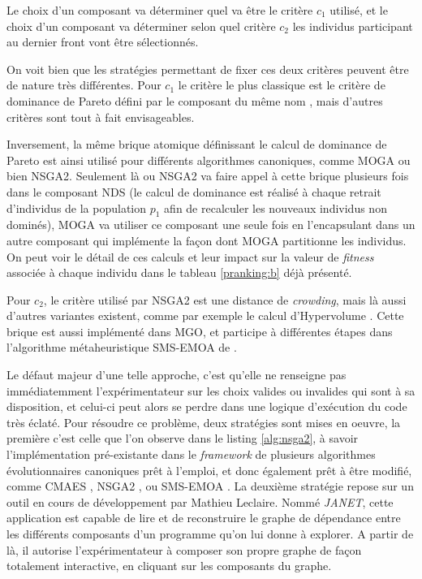Le choix d'un composant  va déterminer quel va être le critère $c_1$ utilisé, et le choix d'un composant  va déterminer selon quel critère $c_2$ les individus participant au dernier front vont être sélectionnés.

On voit bien que les stratégies permettant de fixer ces deux critères peuvent être de nature très différentes. Pour $c_1$ le critère le plus classique est le critère de dominance de Pareto défini par le composant du même nom , mais d'autres critères sont tout à fait envisageables.

Inversement, la même brique atomique  définissant le calcul de dominance de Pareto est ainsi utilisé pour différents algorithmes canoniques, comme MOGA ou bien NSGA2. Seulement là ou NSGA2 va faire appel à cette brique plusieurs fois dans le composant NDS (le calcul de dominance est réalisé à chaque retrait d'individus de la population $p_1$ afin de recalculer les nouveaux individus non dominés), MOGA va utiliser ce composant une seule fois en l'encapsulant dans un autre composant qui implémente la façon dont MOGA partitionne les individus. On peut voir le détail de ces calculs et leur impact sur la valeur de \textit{fitness} associée à chaque individu dans le tableau \ref{pranking:b} déjà présenté.

Pour $c_2$, le critère utilisé par NSGA2 est une distance de \textit{crowding}, mais là aussi d'autres variantes existent, comme par exemple le calcul d'Hypervolume \autocite{Fonseca2006}. Cette brique  est aussi implémenté dans MGO, et participe à différentes étapes dans l'algorithme métaheuristique SMS-EMOA de \textcite{Emmerich2005}.

Le défaut majeur d'une telle approche, c'est qu'elle ne renseigne pas immédiatemment l'expérimentateur sur les choix valides ou invalides qui sont à sa disposition, et celui-ci peut alors se perdre dans une logique d'exécution du code très éclaté. Pour résoudre ce problème, deux stratégies sont mises en oeuvre, la première c'est celle que l'on observe dans le listing \ref{alg:nsga2}, à savoir l'implémentation pré-existante dans le \textit{framework} de plusieurs algorithmes évolutionnaires canoniques prêt à l'emploi, et donc également prêt à être modifié, comme CMAES \autocite{Hansen2001}, NSGA2 \autocite{Deb2001}, ou SMS-EMOA \autocite{Emmerich2005}. La deuxième stratégie repose sur un outil en cours de développement par Mathieu Leclaire. Nommé \textit{JANET}, cette application est capable de lire et de reconstruire le graphe de dépendance entre les différents composants d'un programme qu'on lui donne à explorer. A partir de là, il autorise l'expérimentateur à composer son propre graphe de façon totalement interactive, en cliquant sur les composants du graphe.

